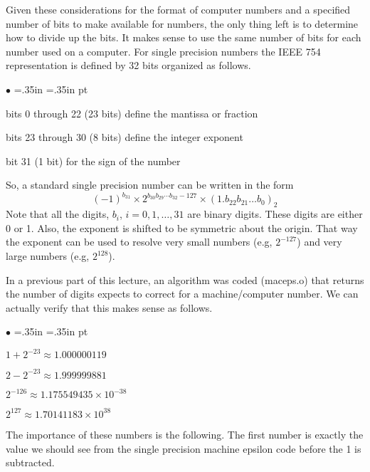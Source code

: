 \documentclass[10pt,fleqn]{article}
\begin{document}
Given these considerations for the format of computer numbers and a specified
number of bits to make available for numbers, the only thing left is to
determine how to divide up the bits. It makes sense to use the same number of
bits for each number used on a computer. For single precision numbers the IEEE
754 representation is defined by 32 bits organized as follows.
\begin{list}{$\bullet$}{ \parsep=0pt \listparindent=0pt
\topsep=0pt \rightmargin=.35in \leftmargin=.35in  pt
\itemsep=2pt}
  \item bits 0 through 22 (23 bits) define the mantissa or fraction
  \item bits 23 through 30 (8 bits) define the integer exponent
  \item bit 31 (1 bit) for the sign of the number
\end{list}
So, a standard single precision number can be written in the form
\[
  (-1)^{b_{31}} \times 2^{b_{30}b_{29}\cdots b_{32}-127}
     \times (1.b_{22}b_{21}\ldots b_{0})_2
\]
Note that all the digits, $b_i$, $i=0,1,\ldots,31$ are binary digits. These
digits are either 0 or 1. Also, the exponent is shifted to be symmetric about
the origin. That way the exponent can be used to resolve very small numbers
(e.g, $2^{-127}$) and very large numbers (e.g, $2^{128}$). 

In a previous part of this lecture, an algorithm was coded (maceps.o) that
returns the number of digits expects to correct for a machine/computer number.
We can actually verify that this makes sense as follows.
\begin{list}{$\bullet$}{ \parsep=0pt \listparindent=0pt
\topsep=0pt \rightmargin=.35in \leftmargin=.35in  pt
\itemsep=2pt}
  \item $1 + 2^{-23} \approx 1.000000119$
  \item $2 - 2^{-23} \approx 1.999999881$
  \item $2^{-126} \approx 1.175549435 \times 10^{-38}$
  \item $2^{127} \approx 1.70141183 \times 10^{38}$
\end{list}
The importance of these numbers is the following. The first number is exactly
the value we should see from the single precision machine epsilon code before
the 1 is subtracted.
\end{document}
